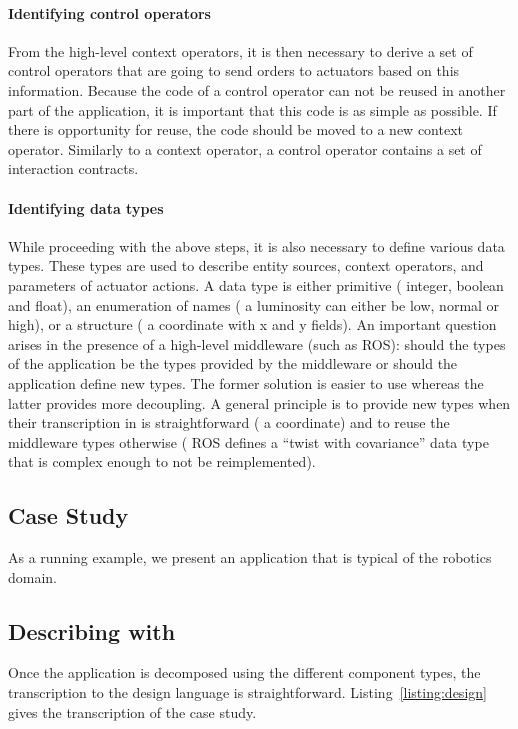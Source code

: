 \paragraph{Identifying control operators}
From the high-level context operators, it is then necessary to derive
a set of control operators that are going to send orders to actuators
based on this information. Because the code of a control operator can
not be reused in another part of the application, it is important that
this code is as simple as possible. If there is opportunity for reuse,
the code should be moved to a new context operator. Similarly to a
context operator, a control operator contains a set of interaction
contracts.

\paragraph{Identifying data types}
While proceeding with the above steps, it is also necessary to define
various data types. These types are used to describe entity sources,
context operators, and parameters of actuator actions. A data type is
either primitive (\eg{} integer, boolean and float), an enumeration of
names (\eg{} a luminosity can either be low, normal or high), or a
structure (\eg{} a coordinate with x and y fields). An important
question arises in the presence of a high-level middleware
(such as ROS): should the types of the application be the types
provided by the middleware or should the application define
new types. The former solution is easier to use whereas the latter
provides more decoupling. A general principle is to provide new types
when their transcription in \diaspec{} is straightforward (\eg{} a
coordinate) and to reuse the middleware types otherwise (\eg{}
ROS defines a ``twist with covariance'' data type that is complex
enough to not be reimplemented).

\subsection{Case Study}

As a running example, we present an application that is typical of the
robotics domain.

\subsection{Describing with \diaspec{}}

Once the application is decomposed using the different component types,
the transcription to the \diaspec{} design language is
straightforward. Listing~\ref{listing:design} gives the transcription
of the case study.

